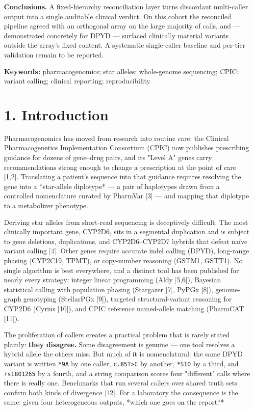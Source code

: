 \documentclass[11pt]{article}
\begin{document}
\textbf{Conclusions.} A fixed-hierarchy reconciliation layer turns discordant multi-caller output into a single auditable clinical verdict. On this cohort the reconciled pipeline agreed with an orthogonal array on the large majority of calls, and --- demonstrated concretely for DPYD --- surfaced clinically material variants outside the array's fixed content. A systematic single-caller baseline and per-tier validation remain to be reported.

\textbf{Keywords:} pharmacogenomics; star alleles; whole-genome sequencing; CPIC; variant calling; clinical reporting; reproducibility


\section*{1. Introduction}

Pharmacogenomics has moved from research into routine care: the Clinical Pharmacogenetics Implementation Consortium (CPIC) now publishes prescribing guidance for dozens of gene--drug pairs, and its "Level A" genes carry recommendations strong enough to change a prescription at the point of care [1,2]. Translating a patient's sequence into that guidance requires resolving the gene into a *star-allele diplotype* --- a pair of haplotypes drawn from a controlled nomenclature curated by PharmVar [3] --- and mapping that diplotype to a metabolizer phenotype.

Deriving star alleles from short-read sequencing is deceptively difficult. The most clinically important gene, CYP2D6, sits in a segmental duplication and is subject to gene deletions, duplications, and CYP2D6--CYP2D7 hybrids that defeat naïve variant calling [4]. Other genes require accurate indel calling (DPYD), long-range phasing (CYP2C19, TPMT), or copy-number reasoning (GSTM1, GSTT1). No single algorithm is best everywhere, and a distinct tool has been published for nearly every strategy: integer linear programming (Aldy [5,6]), Bayesian statistical calling with population phasing (Stargazer [7], PyPGx [8]), genome-graph genotyping (StellarPGx [9]), targeted structural-variant reasoning for CYP2D6 (Cyrius [10]), and CPIC reference named-allele matching (PharmCAT [11]).

The proliferation of callers creates a practical problem that is rarely stated plainly: \textbf{they disagree.} Some disagreement is genuine --- one tool resolves a hybrid allele the others miss. But much of it is nomenclatural: the same DPYD variant is written \texttt{*9A} by one caller, \texttt{c.85T\textgreater{}C} by another, \texttt{*S10} by a third, and \texttt{rs1801265} by a fourth, and a string comparison scores four "different" calls where there is really one. Benchmarks that run several callers over shared truth sets confirm both kinds of divergence [12]. For a laboratory the consequence is the same: given four heterogeneous outputs, *which one goes on the report?*
\end{document}
